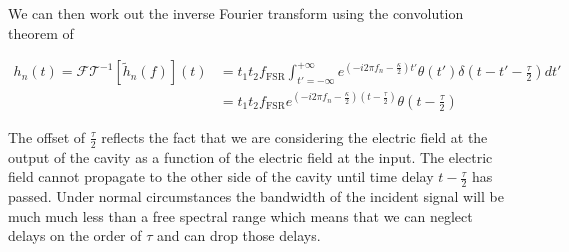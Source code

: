 \documentclass[12pt]{article}
\begin{document}
We can then work out the inverse Fourier transform using the convolution theorem of

\begin{align}
h_n(t) = \mathcal{FT}^{-1}\left[\tilde{h}_n(f)\right](t) &= t_1t_2 f_{\text{FSR}} \int_{t'=-\infty}^{+\infty} e^{\left(-i2\pi f_n - \frac{\kappa}{2}\right)t'}\theta(t') \delta\left(t-t'-\frac{\tau}{2}\right) dt'\\
&= t_1t_2 f_{\text{FSR}} e^{\left(-i2 \pi f_n - \frac{\kappa}{2} \right) \left(t - \frac{\tau}{2}\right) } \theta\left(t - \frac{\tau}{2} \right)
\end{align}

The offset of $\frac{\tau}{2}$ reflects the fact that we are considering the electric field at the output of the cavity as a function of the electric field at the input. The electric field cannot propagate to the other side of the cavity until time delay $t-\frac{\tau}{2}$ has passed. Under normal circumstances the bandwidth of the incident signal will be much much less than a free spectral range which means that we can neglect delays on the order of $\tau$ and can drop those delays.
\end{document}
